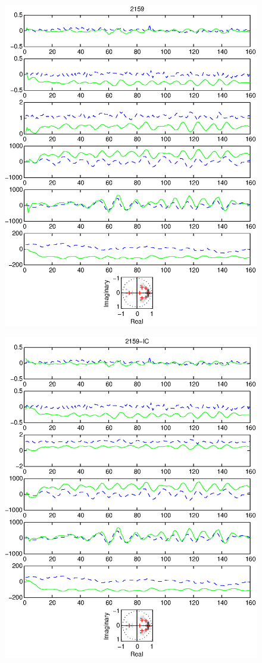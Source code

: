 \documentclass{article}
\begin{document}
\begin{figure}[htb!]\centering
\includegraphics{2159.eps}
\end{figure}\clearpage
\begin{figure}[htb!]\centering
\includegraphics{2159_ic.eps}
\end{figure}\clearpage
\end{document}
